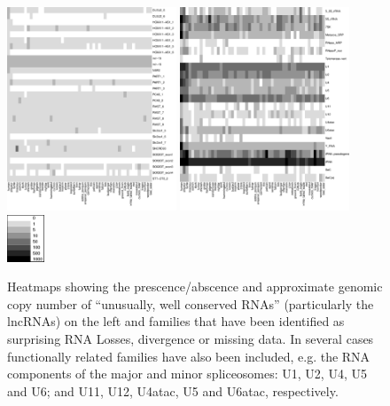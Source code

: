 \documentclass[10pt]{bmc_article}
\newenvironment{bmcformat}{\begin{raggedright}\baselineskip20pt\sloppy\setboolean{publ}{false}}{\end{raggedright}\baselineskip20pt\sloppy}
\begin{document}
\begin{bmcformat}
\begin{figure}[ht]
  \includegraphics[width=0.45\textwidth]{figures/unusual-conserved.pdf}
  \includegraphics[width=0.45\textwidth]{figures/diverged.pdf}
  \includegraphics[width=0.1\textwidth]{figures/key2.pdf}
  \caption[]{Heatmaps showing the prescence/abscence and approximate
    genomic copy number of ``unusually, well conserved RNAs''
    (particularly the lncRNAs) on the left and families that have been
    identified as surprising RNA Losses, divergence or missing
    data. In several cases functionally related families have also
    been included, e.g. the RNA components of the major and minor
    spliceosomes: U1, U2, U4, U5 and U6; and U11, U12, U4atac, U5 and
    U6atac, respectively.}\label{fig:5}
\end{figure}



\end{bmcformat}
\end{document}
